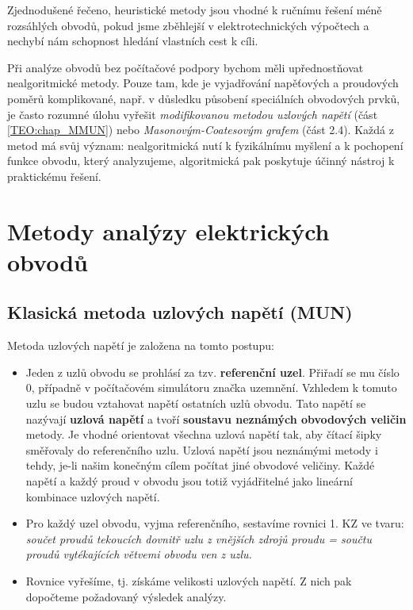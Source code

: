       Zjednodušené řečeno, heuristické metody jsou vhodné k ručnímu řešení méně rozsáhlých obvodů, 
      pokud jsme zběhlejší v elektrotechnických výpočtech a nechybí nám schopnost hledání vlastních 
      cest k cíli.
      
      Při analýze obvodů bez počítačové podpory bychom měli upřednostňovat nealgoritmické metody. 
      Pouze tam, kde je vyjadřování napěťových a proudových poměrů komplikované, např. v důsledku 
      působení speciálních obvodových prvků, je často rozumné úlohu vyřešit \emph{modifikovanou 
      metodou uzlových napětí} (část \ref{TEO:chap_MMUN}) nebo \emph{Masonovým-Coatesovým grafem} 
      (část 2.4). Každá z metod má svůj význam: nealgoritmická nutí k fyzikálnímu myšlení a k 
      pochopení funkce obvodu, který analyzujeme, algoritmická pak poskytuje účinný nástroj k 
      praktickému řešení.

  \section{Metody analýzy elektrických ob\-vo\-dů}
    \subsection{Klasická metoda uzlových napětí (MUN)}
      Metoda uzlových napětí je založena na tomto postupu:
      \begin{itemize}
       \item Jeden z uzlů obvodu se prohlásí za tzv. \textbf{referenční uzel}. Přiřadí se mu 
             číslo 0, případně v počítačovém simulátoru značka uzemnění. Vzhledem k tomuto uzlu se 
             budou vztahovat napětí ostatních uzlů obvodu. Tato napětí se nazývají \textbf{uzlová 
             napětí} a tvoří \textbf{soustavu neznámých obvodových veličin} metody. Je vhodné 
             orientovat všechna uzlová napětí tak, aby čítací šipky směřovaly do referenčního uzlu. 
             Uzlová napětí jsou neznámými metody i tehdy, je-li našim konečným cílem počítat 
             jiné obvodové veličiny. Každé napětí a každý proud v obvodu jsou totiž vyjádřitelné 
             jako lineární kombinace uzlových napětí.
       \item Pro každý uzel obvodu, vyjma referenčního, sestavíme rovnici 1. KZ ve tvaru:
             \emph{součet proudů tekoucích dovnitř uzlu z vnějších zdrojů proudu  = součtu proudů
             vytékajících větvemi obvodu ven z uzlu.}
       \item Rovnice vyřešíme, tj. získáme velikosti uzlových napětí. Z nich pak dopočteme  
             požadovaný výsledek analýzy.
      \end{itemize}
      
